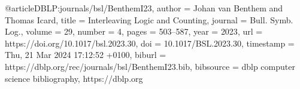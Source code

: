 @article{DBLP:journals/bsl/BenthemI23,
  author       = {Johan van Benthem and
                  Thomas Icard},
  title        = {Interleaving Logic and Counting},
  journal      = {Bull. Symb. Log.},
  volume       = {29},
  number       = {4},
  pages        = {503--587},
  year         = {2023},
  url          = {https://doi.org/10.1017/bsl.2023.30},
  doi          = {10.1017/BSL.2023.30},
  timestamp    = {Thu, 21 Mar 2024 17:12:52 +0100},
  biburl       = {https://dblp.org/rec/journals/bsl/BenthemI23.bib},
  bibsource    = {dblp computer science bibliography, https://dblp.org}
}

